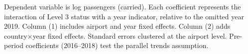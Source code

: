 \begin{table}[htbp]
   \par \raggedright 
   Dependent variable is log passengers (carried). Each coefficient represents the interaction of Level 3 status with a year indicator, relative to the omitted year 2019. Column (1) includes airport and year fixed effects. Column (2) adds country$\times$year fixed effects. Standard errors clustered at the airport level. Pre-period coefficients (2016--2018) test the parallel trends assumption.
\end{table}


